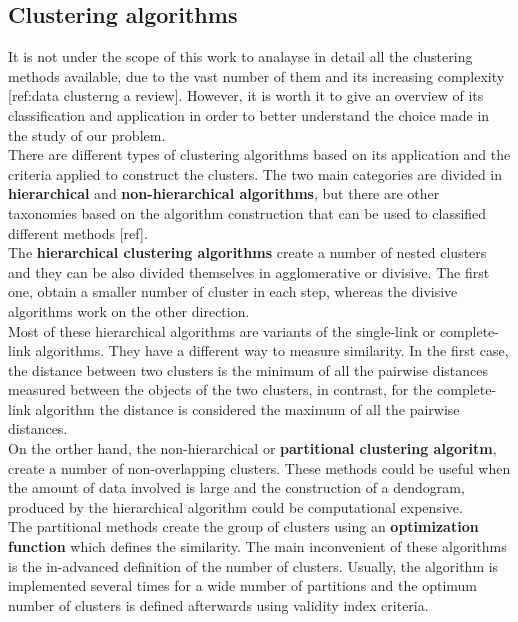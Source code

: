 \subsection{Clustering algorithms}

It is not under the scope of this work to analayse in detail all the clustering methods available, due to the vast number of them and its increasing complexity [ref:data clusterng a review]. However, it is worth it to give an overview of its classification and application in order to better understand the choice made in the study of our problem.\\

There are different types of clustering algorithms based on its application and the criteria applied to construct the clusters. The two main categories are divided in \textbf{hierarchical} and \textbf{non-hierarchical algorithms}, but there are other taxonomies based on the algorithm construction that can be used to classified different methods [ref].\\

The \textbf{hierarchical clustering algorithms} create a number of nested clusters and they can be also divided themselves in agglomerative or divisive. The first one, obtain a smaller number of cluster in each step, whereas the divisive algorithms work on the other direction.\\

Most of these hierarchical algorithms are variants of the single-link or complete-link algorithms. They have a different way to measure similarity. In the first case, the distance between two clusters is the minimum of all the pairwise distances measured between the objects of the two clusters, in contrast, for the complete-link algorithm the distance is considered the maximum of all the pairwise distances.\\

On the orther hand, the non-hierarchical or \textbf{partitional clustering algoritm}, create a number of non-overlapping clusters. These methods could be useful when the amount of data involved is large and the construction of a dendogram, produced by the hierarchical algorithm could be computational expensive.\\

The partitional methods create the group of clusters using an \textbf{optimization function} which defines the similarity. The main inconvenient of these algorithms is the in-advanced definition of the number of clusters. Usually, the algorithm is implemented several times for a wide number of partitions and the optimum number of clusters is defined afterwards using validity index criteria.\\

